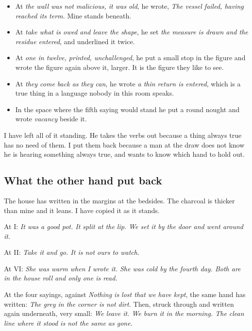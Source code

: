 \documentclass{design/chronicle}
\begin{document}
\begin{itemize}[leftmargin=1.4em,itemsep=1pt,topsep=3pt,parsep=0pt]

\item At \emph{the wall was not malicious, it was old}, he wrote, \emph{The vessel failed, having reached its term.} Mine stands beneath.

\item At \emph{take what is owed and leave the shape}, he set \emph{the measure is drawn and the residue entered}, and underlined it twice.

\item At \emph{one in twelve, printed, unchallenged}, he put a small stop in the figure and wrote the figure again above it, larger. It is the figure they like to see.

\item At \emph{they come back as they can}, he wrote \emph{a thin return is entered}, which is a true thing in a language nobody in this room speaks.

\item In the space where the fifth saying would stand he put a round nought and wrote \emph{vacancy} beside it.

\end{itemize}

I have left all of it standing. He takes the verbs out because a thing always true has no need of them. I put them back because a man at the draw does not know he is hearing something always true, and wants to know which hand to hold out.

\subsection*{What the other hand put back}

The house has written in the margins at the bedsides. The charcoal is thicker than mine and it leans. I have copied it as it stands.

At I: \emph{It was a good pot. It split at the lip. We set it by the door and went around it.}

At II: \emph{Take it and go. It is not ours to watch.}

At VI: \emph{She was warm when I wrote it. She was cold by the fourth day. Both are in the house roll and only one is read.}

At the four sayings, against \emph{Nothing is lost that we have kept}, the same hand has written: \emph{The grey in the corner is not dirt.} Then, struck through and written again underneath, very small: \emph{We leave it. We burn it in the morning. The clean line where it stood is not the same as gone.}
\end{document}
